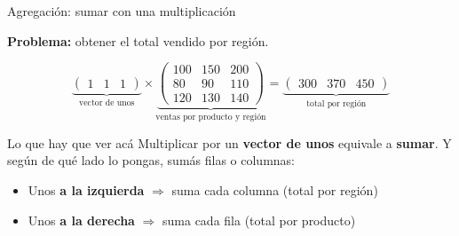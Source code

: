 \documentclass[aspectratio=169,10pt]{beamer}
\begin{document}
\begin{frame}{Agregación: sumar con una multiplicación}

\textbf{Problema:} obtener el total vendido por región.

\vspace{0.3cm}
$$\underbrace{\begin{pmatrix} 1 & 1 & 1 \end{pmatrix}}_{\text{vector de unos}}
\times
\underbrace{\begin{pmatrix} 100 & 150 & 200 \\ 80 & 90 & 110 \\ 120 & 130 & 140 \end{pmatrix}}_{\text{ventas por producto y región}}
=
\underbrace{\begin{pmatrix} 300 & 370 & 450 \end{pmatrix}}_{\text{total por región}}$$

\vspace{0.4cm}
\begin{block}{Lo que hay que ver acá}
Multiplicar por un \textbf{vector de unos} equivale a \textbf{sumar}. Y según de qué lado lo pongas,
sumás filas o columnas:
\begin{itemize}
    \item Unos \textbf{a la izquierda} $\Rightarrow$ suma cada columna (total por región)
    \item Unos \textbf{a la derecha} $\Rightarrow$ suma cada fila (total por producto)
\end{itemize}
\end{block}
\end{frame}
\end{document}
